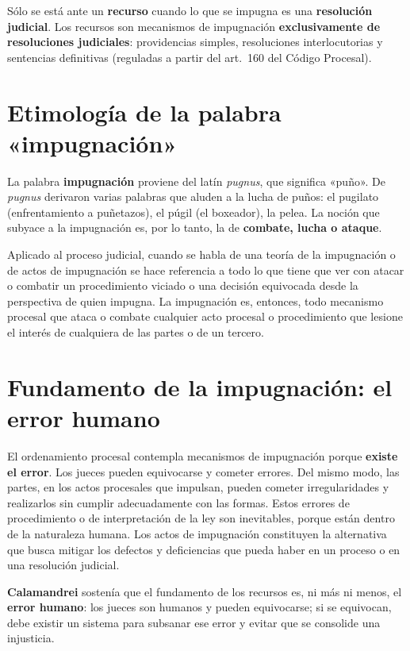 \documentclass[12pt,oneside]{book}
\begin{document}
\begin{important}
S\'olo se est\'a ante un \textbf{recurso} cuando lo que se impugna es una \textbf{resoluci\'on judicial}. Los recursos son mecanismos de impugnaci\'on \textbf{exclusivamente de resoluciones judiciales}: providencias simples, resoluciones interlocutorias y sentencias definitivas (reguladas a partir del art.~160 del C\'odigo Procesal).
\end{important}

\section{Etimología de la palabra «impugnación»}

La palabra \textbf{impugnación} proviene del latín \textit{pugnus}, que significa «puño». De \textit{pugnus} derivaron varias palabras que aluden a la lucha de puños: el pugilato (enfrentamiento a puñetazos), el púgil (el boxeador), la pelea. La noción que subyace a la impugnación es, por lo tanto, la de \textbf{combate, lucha o ataque}.

Aplicado al proceso judicial, cuando se habla de una teoría de la impugnación o de actos de impugnación se hace referencia a todo lo que tiene que ver con atacar o combatir un procedimiento viciado o una decisión equivocada desde la perspectiva de quien impugna. La impugnación es, entonces, todo mecanismo procesal que ataca o combate cualquier acto procesal o procedimiento que lesione el interés de cualquiera de las partes o de un tercero.

\section{Fundamento de la impugnación: el error humano}

El ordenamiento procesal contempla mecanismos de impugnación porque \textbf{existe el error}. Los jueces pueden equivocarse y cometer errores. Del mismo modo, las partes, en los actos procesales que impulsan, pueden cometer irregularidades y realizarlos sin cumplir adecuadamente con las formas. Estos errores de procedimiento o de interpretación de la ley son inevitables, porque están dentro de la naturaleza humana. Los actos de impugnación constituyen la alternativa que busca mitigar los defectos y deficiencias que pueda haber en un proceso o en una resolución judicial.

\textbf{Calamandrei} sosten\'ia que el fundamento de los recursos es, ni m\'as ni menos, el \textbf{error humano}: los jueces son humanos y pueden equivocarse; si se equivocan, debe existir un sistema para subsanar ese error y evitar que se consolide una injusticia.
\end{document}
